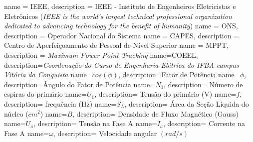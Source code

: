 %
%
{
  name = {IEEE},
  description = {IEEE - Instituto de 
      Engenheiros Eletricistas e Eletrônicos (\textit{IEEE is the world's largest technical professional organization dedicated to advancing technology for the benefit of humanity})}
}
{
  name = {ONS},
  description = {Operador Nacional do 
      Sistema}
}
{
   name = {CAPES},
   description = {Centro de Aperfeiçoamento 
       de Pessoal de Nível Superior}
}
{
   name = {MPPT},
   description = {\textit{Maximum Power 
       Point Tracking}}
}
{
   name={COEEL},
   description={\textit{Coordenação do Curso de Engenharia Elétrica do IFBA campus Vitória da Conquista}}
}
%
%
{
   name={$cos(\phi)$},
   description={Fator de Potência}
}
{
   name={$\phi$},
   description={Ângulo do Fator de Potência}
}
{
   name={$N_1$},
   description= Número de espiras do primário
}
{
   name={$U_1$},
   description= Tensão do primário (V)
}
{
   name={$f$},
   description= frequência (Hz)
}
{
   name={$S_L$},
   description= Área da Seção Líquida do núcleo ($cm^2$)
}
{
   name={$B$},
   description= Densidade de Fluxo Magnético (Gauss)
}
{
   name={$U_a$},
   description= Tensão na Fase A
}
{
   name={$I_a$},
   description= Corrente na Fase A
}
{
   name={$\omega$},
   description= Velocidade angular $(rad/s)$ 
}



